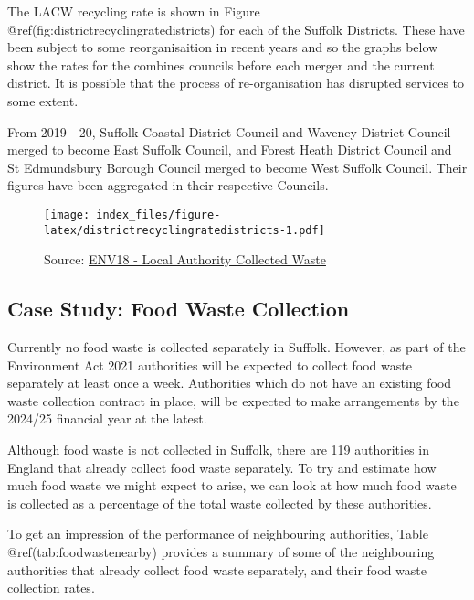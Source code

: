 \documentclass[
]{article}
\begin{document}
The LACW recycling rate is shown in Figure
@ref(fig:districtrecyclingratedistricts) for each of the Suffolk
Districts. These have been subject to some reorganisaition in recent
years and so the graphs below show the rates for the combines councils
before each merger and the current district. It is possible that the
process of re-organisation has disrupted services to some extent.

From 2019 - 20, Suffolk Coastal District Council and Waveney District
Council merged to become East Suffolk Council, and Forest Heath District
Council and St Edmundsbury Borough Council merged to become West Suffolk
Council. Their figures have been aggregated in their respective
Councils.

\begin{figure}
\centering
\texttt{[image: index\_files/figure-latex/districtrecyclingratedistricts-1.pdf]}
\caption{Source:
\href{https://www.gov.uk/government/statistical-data-sets/env18-local-authority-collected-waste-annual-results-tables}{ENV18
- Local Authority Collected Waste}}
\end{figure}

\hypertarget{case-study-food-waste-collection}{%
\subsection{Case Study: Food Waste
Collection}\label{case-study-food-waste-collection}}

Currently no food waste is collected separately in Suffolk. However, as
part of the Environment Act 2021 authorities will be expected to collect
food waste separately at least once a week. Authorities which do not
have an existing food waste collection contract in place, will be
expected to make arrangements by the 2024/25 financial year at the
latest.

Although food waste is not collected in Suffolk, there are 119
authorities in England that already collect food waste separately. To
try and estimate how much food waste we might expect to arise, we can
look at how much food waste is collected as a percentage of the total
waste collected by these authorities.

To get an impression of the performance of neighbouring authorities,
Table @ref(tab:foodwastenearby) provides a summary of some of the
neighbouring authorities that already collect food waste separately, and
their food waste collection rates.

\providecommand{\docline}[3]{\noalign{\global\setlength{\arrayrulewidth}{#1}}\arrayrulecolor[HTML]{#2}\cline{#3}}
\end{document}
